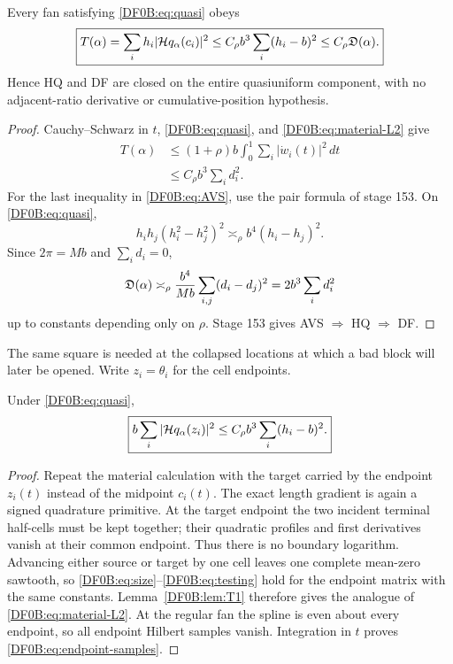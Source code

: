 \begin{theorem}
\label{DF0B:thm:AVS}
Every fan satisfying \eqref{DF0B:eq:quasi} obeys
\begin{equation}\label{DF0B:eq:AVS}
 \boxed{
 T(\alpha)=\sum_i h_i|\mathcal H q_\alpha(c_i)|^2
 \le C_\rho b^3\sum_i(h_i-b)^2
 \le C_\rho\mathfrak D(\alpha).}
\end{equation}
Hence HQ and DF are closed on the entire quasiuniform component, with no
adjacent-ratio derivative or cumulative-position hypothesis.
\end{theorem}

\begin{proof}
Cauchy--Schwarz in $t$, \eqref{DF0B:eq:quasi}, and
\eqref{DF0B:eq:material-L2} give
\begin{align*}
 T(\alpha)
 &\le(1+\rho)b\int_0^1\sum_i|\dot w_i(t)|^2\,dt\\
 &\le C_\rho b^3\sum_i d_i^2.
\end{align*}
For the last inequality in \eqref{DF0B:eq:AVS}, use the pair formula of stage
153.  On \eqref{DF0B:eq:quasi},
\[
 h_ih_j(h_i^2-h_j^2)^2\asymp_\rho
 b^4(h_i-h_j)^2.
\]
Since $2\pi=Mb$ and $\sum_i d_i=0$,
\[
 \mathfrak D(\alpha)
 \asymp_\rho\frac{b^4}{Mb}
 \sum_{i,j}(d_i-d_j)^2
 =2b^3\sum_i d_i^2
\]
up to constants depending only on $\rho$.  Stage 153 gives
AVS $\Rightarrow$ HQ $\Rightarrow$ DF.
\end{proof}

The same square is needed at the collapsed locations at which a bad
block will later be opened.  Write $z_i=\theta_i$ for the cell endpoints.

\begin{corollary}
\label{DF0B:cor:endpoints}
Under \eqref{DF0B:eq:quasi},
\begin{equation}\label{DF0B:eq:endpoint-samples}
 \boxed{
 b\sum_i|\mathcal H q_\alpha(z_i)|^2
 \le C_\rho b^3\sum_i(h_i-b)^2.}
\end{equation}
\end{corollary}

\begin{proof}
Repeat the material calculation with the target carried by the endpoint
$z_i(t)$ instead of the midpoint $c_i(t)$.  The exact length gradient is
again a signed quadrature primitive.  At the target endpoint the two
incident terminal half-cells must be kept together; their quadratic
profiles and first derivatives vanish at their common endpoint.  Thus
there is no boundary logarithm.  Advancing either source or target by one
cell leaves one complete mean-zero sawtooth, so
\eqref{DF0B:eq:size}--\eqref{DF0B:eq:testing} hold for the endpoint matrix with the
same constants.  Lemma~\ref{DF0B:lem:T1} therefore gives the analogue of
\eqref{DF0B:eq:material-L2}.  At the regular fan the spline is even about every
endpoint, so all endpoint Hilbert samples vanish.  Integration in $t$
proves \eqref{DF0B:eq:endpoint-samples}.
\end{proof}

